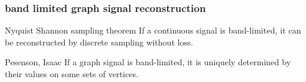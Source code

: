\documentclass{beamer}
\begin{document}
\begin{frame}
\frametitle{band limited graph signal reconstruction}
\begin{block}{Nyquist Shannon sampling theorem}
If a continuous signal is band-limited, it can be reconstructed by discrete sampling without loss.
\end{block}
\begin{block}{Pesenson, Isaac}
If a graph signal is band-limited, it is uniquely determined by their values on some sets of vertices.
\end{block}
\end{frame}

\end{document}
